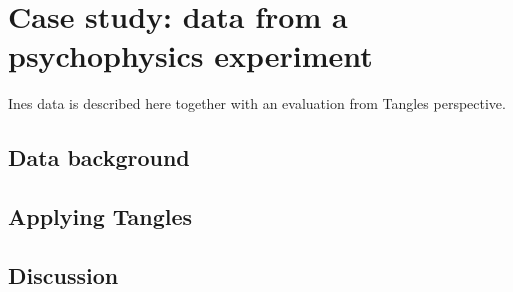 \chapter{Case study: data from a psychophysics experiment}\label{simulations}
Ines data is described here together with an evaluation from Tangles perspective.
\section{Data background}
\section{Applying Tangles}
\section{Discussion}




